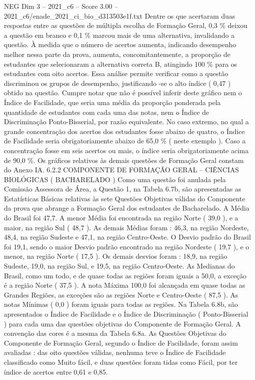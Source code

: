 \begin{textsample}{NEG Dim 3 – 2021\_c6 – Score 3.00 – 2021\_c6/enade\_2021\_ci\_bio\_d313503e1f.txt}
Dentre os que acertaram duas respostas entre as questões de múltipla escolha de Formação Geral, 0,3 \% deixou a questão em branco e 0,1 \% marcou mais de uma alternativa, invalidando a questão.
À medida que o número de acertos aumenta, indicando desempenho melhor nessa parte da prova, aumenta, concomitantemente, a proporção de estudantes que selecionaram a alternativa correta B, atingindo 100 \% para os estudantes com oito acertos.
Essa análise permite verificar como a questão discriminou os grupos de desempenho, justificando -se o alto índice ( 0,47 ) obtido na questão.
Cumpre notar que não é possível inferir deste gráfico nem o Índice de Facilidade, que seria uma média da proporção ponderada pela quantidade de estudantes com cada uma das notas, nem o Índice de Discriminação Ponto-Bisserial, por razão equivalente.
No caso extremo, no qual a grande concentração dos acertos dos estudantes fosse abaixo de quatro, o Índice de Facilidade seria obrigatoriamente abaixo de 65,0 \% ( neste exemplo ).
Caso a concentração fosse em seis acertos ou mais, o índice seria obrigatoriamente acima de 90,0 \%.
Os gráficos relativos às demais questões de Formação Geral constam do Anexo IA. 6.2.2 COMPONENTE DE FORMAÇÃO GERAL – CIÊNCIAS BIOLÓGICAS ( BACHARELADO ) Como uma questão foi anulada pela Comissão Assessora de Área, a Questão 1, na Tabela 6.7b, são apresentadas as Estatísticas Básicas relativas às sete Questões Objetivas válidas do Componente da prova que abrange a Formação Geral dos estudantes de Bacharelado.
A Média do Brasil foi 47,7.
A menor Média foi encontrada na região Norte ( 39,0 ), e a maior, na região Sul ( 48,7 ).
As demais Médias foram : 46,3, na região Nordeste, 48,4, na região Sudeste e 47,1, na região Centro-Oeste.
O Desvio padrão do Brasil foi 19,1, sendo o maior Desvio padrão encontrado na região Nordeste ( 19,7 ), e o menor, na região Norte ( 17,5 ).
Os demais desvios foram : 18,9, na região Sudeste, 19,0, na região Sul, e 19,5, na região Centro-Oeste.
As Medianas do Brasil, como um todo, e de quase todas as regiões foram iguais a 50,0, a exceção é a região Norte ( 37,5 ).
A nota Máxima 100,0 foi alcançada em quase todas as Grandes Regiões, as exceções são as regiões Norte e Centro-Oeste ( 87,5 ).
As notas Mínimas ( 0,0 ) foram iguais para todas as regiões.
Na Tabela 6.8b, são apresentados o Índice de Facilidade e o Índice de Discriminação ( Ponto-Bisserial ) para cada uma das questões objetivas do Componente de Formação Geral.
A convenção das cores é a mesma da Tabela 6.8a.
As Questões Objetivas do Componente de Formação Geral, segundo o Índice de Facilidade, foram assim avaliadas : das oito questões válidas, nenhuma teve o Índice de Facilidade classificado como Muito fácil, e duas questões foram tidas como Fácil, por ter índice de acertos entre 0,61 e 0,85.

\end{textsample}
